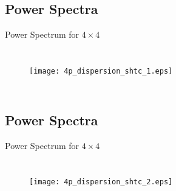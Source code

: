 \documentclass{beamer}
\begin{document}
\subsection{Power Spectra}
\begin{frame}{Power Spectrum for $4 \times 4$}
\begin{columns}
\begin{figure}[t]
\vspace*{-1cm}
\hspace*{-0.9cm}
\texttt{[image: 4p\_dispersion\_shtc\_1.eps]}
\renewcommand{\figure}{Fig.}
\label{fig:disp_4p}
\end{figure}
\begin{figure}[t]
\vspace*{-1.2cm}
\hspace*{1.9cm}
\renewcommand{\figure}{Fig.}
\label{fig:sed}
\end{figure}
\end{columns}
\end{frame}

\subsection{Power Spectra}
\begin{frame}{Power Spectrum for $4 \times 4$}
\begin{columns}
\begin{figure}[t]
\vspace*{-1cm}
\hspace*{-0.9cm}
\texttt{[image: 4p\_dispersion\_shtc\_2.eps]}
\renewcommand{\figure}{Fig.}
\label{fig:disp_4p}
\end{figure}
\begin{figure}[t]
\vspace*{-1.2cm}
\hspace*{1.9cm}
\renewcommand{\figure}{Fig.}
\label{fig:sed}
\end{figure}
\end{columns}
\end{frame}
\end{document}

